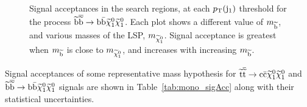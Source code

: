 \begin{figure}[ht!]
\begin{center}
  \caption{Signal acceptances in the search regions, at each $\pt(\jet_1)$ threshold for the process $\ttwobb$. Each plot shows a different value of $m_{\sBot}$, and various masses of the LSP, $m_{\chiOneZero}$. Signal acceptance is greatest when $m_{\sBot}$ is close to $m_{\chiOneZero}$, and increases with increasing $m_{\sBot}$. 
\label{fig:sbottomAcc}}
  \end{center}
\end{figure}


Signal acceptances of some representative mass hypothesis for $\ttwocc$  and $\ttwobb$ signals are shown in Table~\ref{tab:mono_sigAcc} along with their statistical uncertainties. 



